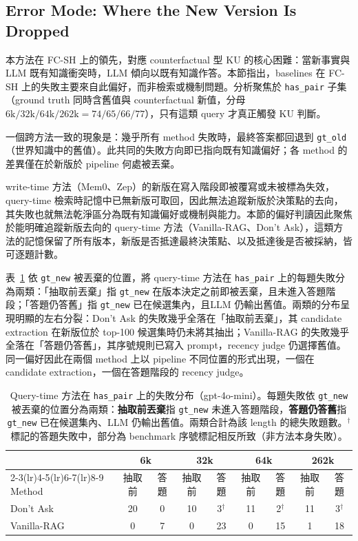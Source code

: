 \subsection{Error Mode: Where the New Version Is Dropped}
\label{subsec:fcsh_errormode}
 
本方法在 FC-SH 上的領先，對應 counterfactual 型 KU 的核心困難：當新事實與 LLM 既有知識衝突時，LLM 傾向以既有知識作答。本節指出，baselines 在 FC-SH 上的失敗主要來自此偏好，而非檢索或機制問題。分析聚焦於 \texttt{has\_pair} 子集（ground truth 同時含舊值與 counterfactual 新值，分母 $6\text{k}/32\text{k}/64\text{k}/262\text{k} = 74/65/66/77$），只有這類 query 才真正觸發 KU 判斷。
 
一個跨方法一致的現象是：幾乎所有 method 失敗時，最終答案都回退到 \texttt{gt\_old}（世界知識中的舊值）。此共同的失敗方向即已指向既有知識偏好；各 method 的差異僅在於新版於 pipeline 何處被丟棄。
 
write-time 方法（Mem0、Zep）的新版在寫入階段即被覆寫或未被標為失效，query-time 檢索時記憶中已無新版可取回，因此無法追蹤新版於決策點的去向，其失敗也就無法乾淨區分為既有知識偏好或機制與能力。本節的偏好判讀因此聚焦於能明確追蹤新版去向的 query-time 方法（Vanilla-RAG、Don't Ask），這類方法的記憶保留了所有版本，新版是否抵達最終決策點、以及抵達後是否被採納，皆可逐題計數。
 
表~\ref{tab:errormode_twocol} 依 \texttt{gt\_new} 被丟棄的位置，將 query-time 方法在 \texttt{has\_pair} 上的每題失敗分為兩類：「抽取前丟棄」指 \texttt{gt\_new} 在版本決定之前即被丟棄，且未進入答題階段；「答題仍答舊」指 \texttt{gt\_new} 已在候選集內，且LLM 仍輸出舊值。兩類的分布呈現明顯的左右分裂：Don't Ask 的失敗幾乎全落在「抽取前丟棄」，其 candidate extraction 在新版位於 top-100 候選集時仍未將其抽出；Vanilla-RAG 的失敗幾乎全落在「答題仍答舊」，其序號規則已寫入 prompt，recency judge 仍選擇舊值。同一偏好因此在兩個 method 上以 pipeline 不同位置的形式出現，一個在 candidate extraction，一個在答題階段的 recency judge。
 
\begin{table}[!htb]
\centering
\caption{Query-time 方法在 \texttt{has\_pair} 上的失敗分布（gpt-4o-mini）。每題失敗依 \texttt{gt\_new} 被丟棄的位置分為兩類：\textbf{抽取前丟棄}指 \texttt{gt\_new} 未進入答題階段，\textbf{答題仍答舊}指 \texttt{gt\_new} 已在候選集內、LLM 仍輸出舊值。兩類合計為該 length 的總失敗題數。$^{\dagger}$ 標記的答題失敗中，部分為 benchmark 序號標記相反所致（非方法本身失敗）。}
\label{tab:errormode_twocol}
\small
\begin{tabular}{lcccccccc}
\toprule
& \multicolumn{2}{c}{6k} & \multicolumn{2}{c}{32k} & \multicolumn{2}{c}{64k} & \multicolumn{2}{c}{262k} \\
\cmidrule(lr){2-3}\cmidrule(lr){4-5}\cmidrule(lr){6-7}\cmidrule(lr){8-9}
Method & 抽取前 & 答題 & 抽取前 & 答題 & 抽取前 & 答題 & 抽取前 & 答題 \\
\midrule
Don't Ask & 20 & 0 & 10 & 3$^{\dagger}$ & 11 & 2$^{\dagger}$ & 11 & 3$^{\dagger}$ \\
Vanilla-RAG & 0 & 7 & 0 & 23 & 0 & 15 & 1 & 18 \\
\bottomrule
\end{tabular}
\end{table}
 
